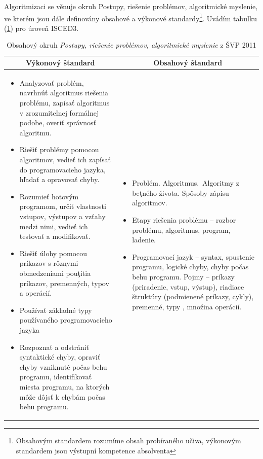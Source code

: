 \documentclass[FP,DP]{tulthesis}
\begin{document}
{{Algoritmizaci se věnuje okruh Postupy, riešenie problémov, algoritmické myslenie, ve kterém jsou dále definovány obsahové a výkonové standardy\footnote{Obsahovým standardem rozumíme obsah probíraného učiva, výkonovým standardem jsou výstupní kompetence absolventa}. Uvádím tabulku (\ref{table:2 }) pro úroveň ISCED3.
{\renewcommand{\arraystretch}{1.4}%
\begin{table}[t]
\footnotesize
\center
\caption{Obsahový okruh \textit {Postupy, riešenie problémov, algoritmické myslenie } z ŠVP 2011} \label{table:2 }
\begin{tabular}{|l|l|}
\hline
\multicolumn{1}{|c|}{Výkonový štandard } & \multicolumn{1}{c|}{Obsahový štandard } \\\hline
\begin{minipage}[t]{0.45\textwidth}
\begin{itemize}[leftmargin=*,nosep]
  	\item Analyzovať problém, navrhnúť algoritmus riešenia problému, zapísať algoritmus v
zrozumiteľnej formálnej podobe, overiť správnosť algoritmu.
	\item Riešiť problémy pomocou algoritmov, vedieť ich zapísať do programovacieho jazyka,
hľadať a opravovať chyby.
\item Rozumieť hotovým programom, určiť vlastnosti vstupov, výstupov a vzťahy medzi
nimi, vedieť ich testovať a modifikovať.

\item Riešiť úlohy pomocou príkazov s rôznymi obmedzeniami pouţitia príkazov,
premenných, typov a operácií.
\item Používať základné typy používaného programovacieho jazyka
\item Rozpoznať a odstrániť syntaktické chyby, opraviť chyby vzniknuté počas behu
programu, identifikovať miesta programu, na ktorých môže dôjsť k chybám počas
behu programu.

\end{itemize}
  \end{minipage} &
  \begin{minipage}[t]{0.45\textwidth}
\begin{itemize}[leftmargin=*,nosep]
  	\item Problém. Algoritmus.~Algoritmy z beţného života. Spôsoby zápisu algoritmov.
	\item Etapy riešenia problému – rozbor problému, algoritmus, program, ladenie.
\item Programovací jazyk -- syntax, spustenie programu, logické chyby, chyby počas behu
programu. Pojmy – príkazy (priradenie, vstup, výstup), riadiace štruktúry (podmienené
príkazy, cykly), premenné, typy , množina operácií.
\end{itemize}
 \end{minipage}


\end{tabular}
\end{table}}}}
\end{document}
